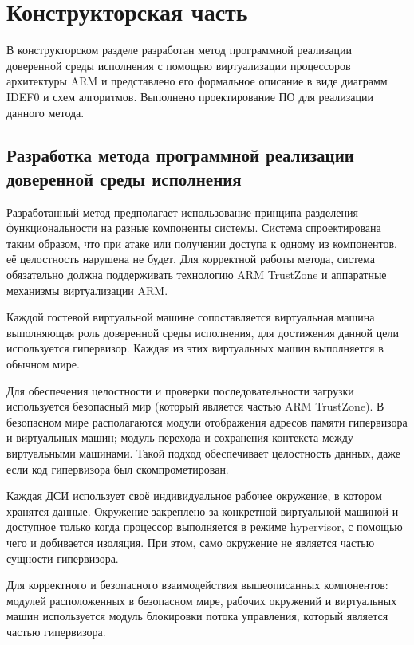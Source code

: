 \section{Конструкторская часть}

В конструкторском разделе разработан метод программной реализации доверенной среды исполнения с помощью виртуализации процессоров архитектуры ARM и представлено его формальное описание в виде диаграмм IDEF0 и схем алгоритмов. Выполнено проектирование ПО для реализации данного метода.

\subsection{Разработка метода программной реализации доверенной среды исполнения}

Разработанный метод предполагает использование принципа разделения функциональности на разные компоненты системы. Система спроектирована таким образом, что при атаке или получении доступа к одному из компонентов, её целостность нарушена не будет. Для корректной работы метода, система обязательно должна поддерживать технологию ARM TrustZone и аппаратные механизмы виртуализации ARM.

Каждой гостевой виртуальной машине сопоставляется виртуальная машина выполняющая роль доверенной среды исполнения, для достижения данной цели используется гипервизор. Каждая из этих виртуальных машин выполняется в обычном мире.

Для обеспечения целостности и проверки последовательности загрузки используется безопасный мир (который является частью ARM TrustZone). В безопасном мире располагаются модули отображения адресов памяти гипервизора и виртуальных машин; модуль перехода и сохранения контекста между виртуальными машинами. Такой подход обеспечивает целостность данных, даже если код гипервизора был скомпрометирован.

Каждая ДСИ использует своё индивидуальное рабочее окружение, в котором хранятся данные. Окружение закреплено за конкретной виртуальной машиной и доступное только когда процессор выполняется в режиме hypervisor, с помощью чего и добивается изоляция. При этом, само окружение не является частью сущности гипервизора.

Для корректного и безопасного взаимодействия вышеописанных компонентов: модулей расположенных в безопасном мире, рабочих окружений и виртуальных машин используется модуль блокировки потока управления, который является частью гипервизора.

